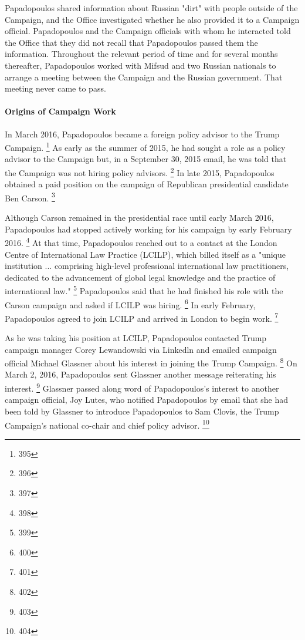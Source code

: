 Papadopoulos shared information about Russian "dirt" with people outside of the Campaign, and the Office investigated whether he also provided it to a Campaign official.
Papadopoulos and the Campaign officials with whom he interacted told the Office that they did not recall that Papadopoulos passed them the information.
Throughout the relevant period of time and for several months thereafter, Papadopoulos worked with Mifsud and two Russian nationals to arrange a meeting between the Campaign and the Russian government.
That meeting never came to pass.

\paragraph{Origins of Campaign Work}

In March 2016, Papadopoulos became a foreign policy advisor to the Trump Campaign.%
\footnote{395}
As early as the summer of 2015, he had sought a role as a policy advisor to the Campaign but, in a September 30, 2015 email, he was told that the Campaign was not hiring policy advisors.%
\footnote{396}
In late 2015, Papadopoulos obtained a paid position on the campaign of Republican presidential candidate Ben Carson.%
\footnote{397}

Although Carson remained in the presidential race until early March 2016, Papadopoulos had stopped actively working for his campaign by early February 2016.%
\footnote{398}
At that time, Papadopoulos reached out to a contact at the London Centre of International Law Practice (LCILP), which billed itself as a "unique institution ... comprising high-level professional international law practitioners, dedicated to the advancement of global legal knowledge and the practice of international law."%
\footnote{399}
Papadopoulos said that he had finished his role with the Carson campaign and asked if LCILP was hiring.%
\footnote{400}
In early February, Papadopoulos agreed to join LCILP and arrived in London to begin work.%
\footnote{401}

As he was taking his position at LCILP, Papadopoulos contacted Trump campaign manager Corey Lewandowski via Linkedln and emailed campaign official Michael Glassner about his interest in joining the Trump Campaign.%
\footnote{402}
On March 2, 2016, Papadopoulos sent Glassner another message reiterating his interest.%
\footnote{403}
Glassner passed along word of Papadopoulos's interest to another campaign official, Joy Lutes, who notified Papadopoulos by email that she had been told by Glassner to introduce Papadopoulos to Sam Clovis, the Trump Campaign's national co-chair and chief policy advisor.%
\footnote{404}

